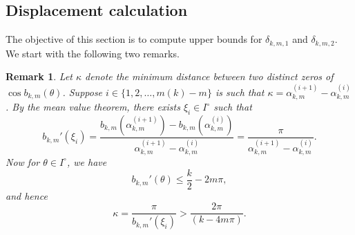 \documentclass[12pt,reqno]{amsart}
\newtheorem{rmk}{Remark}
\begin{document}
\subsection{Displacement calculation} The objective of this section is to compute  
upper bounds for $\delta_{k,m,1}$ and $\delta_{k,m,2}$. We start with the following two remarks.
\begin{rmk}\rm\label{eta}
Let $\kappa$ denote the minimum distance between two distinct zeros of $\cos b_{k,m}(\theta)$. Suppose $i\in\{1,2,\ldots, m(k)-m\}$ is such that
$\kappa={\alpha}_{k,m}^{(i+1)}-\alpha_{k,m}^{(i)}$. By the mean value theorem, there exists
$\xi_i\in I^{\circ}$ such that
$$
b_{k,m}'(\xi_i)=\frac{b_{k,m}({\alpha}_{k,m}^{(i+1)})-b_{k,m}(\alpha_{k,m}^{(i)})}{{\alpha}_{k,m}^{(i+1)}-\alpha_{k,m}^{(i)}}=\frac{\pi}{{\alpha}_{k,m}^{(i+1)}-\alpha_{k,m}^{(i)}}.
$$
Now for $\theta\in I^{\circ}$, we have 
\begin{equation}\label{bk'}
b_{k,m}'(\theta)\le \frac{k}{2}-2m\pi,
\end{equation}
and hence
$$
\kappa=\frac{\pi}{b_{k,m}'(\xi_i)}>\frac{2\pi}{(k-4m\pi)}.
$$
\end{rmk}
\end{document}
